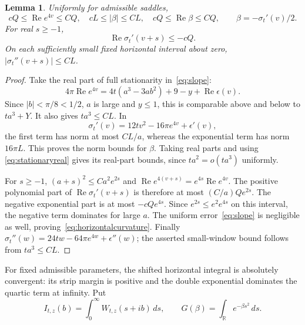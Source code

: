 \documentclass[11pt]{article}
\newtheorem{lemma}[theorem]{Lemma}
\theoremstyle{remark}\newtheorem{remark}[theorem]{Remark}
\newcommand{\R}{\mathbb R}\newcommand{\C}{\mathbb C}
\DeclareMathOperator{\Rea}{Re}\DeclareMathOperator{\Ima}{Im}
\begin{document}
\begin{lemma}\label{lem:geometry}
Uniformly for admissible saddles,
\begin{equation}\label{eq:curvature}
 cQ\leq\Rea e^{4v}\leq CQ,\quad
 cL\leq|\beta|\leq CL,\quad
 cQ\leq\Rea\beta\leq CQ,\qquad
 \beta=-\sigma_t'(v)/2.
\end{equation}
For real $s\geq-1$,
\begin{equation}\label{eq:horizontalcurvature}
 \Rea\sigma_t'(v+s)\leq-cQ.
\end{equation}
On each sufficiently small fixed horizontal interval about
zero, $|\sigma_t''(v+s)|\leq CL$.
\end{lemma}
\begin{proof}
Take the real part of full stationarity in~\eqref{eq:slope}:
\begin{equation}\label{eq:stationaryreal}
 4\pi\Rea e^{4v}
       =4t(a^3-3ab^2)+9-y+\Rea\epsilon(v).
\end{equation}
Since $|b|<\pi/8<1/2$, $a$ is large and $y\leq1$, this is
comparable above and below to $ta^3+Y$. It also gives
$ta^3\leq CL$. In
\[
 \sigma_t'(v)=12tv^2-16\pi e^{4v}+\epsilon'(v),
\]
the first term has norm at most $CL/a$, whereas the
exponential term has norm $16\pi L$. This proves the norm
bounds for $\beta$. Taking real parts and using
\eqref{eq:stationaryreal} gives its real-part bounds, since
$ta^2=o(ta^3)$ uniformly.

For $s\geq-1$, $(a+s)^2\leq Ca^2e^{2s}$ and
$\Rea e^{4(v+s)}=e^{4s}\Rea e^{4v}$.
The positive polynomial part of
$\Rea\sigma_t'(v+s)$ is therefore at most
$(C/a)Qe^{2s}$. The negative exponential part is at most
$-cQe^{4s}$. Since $e^{2s}\leq e^2e^{4s}$ on this interval,
the negative term dominates for large $a$.
The uniform error~\eqref{eq:slope} is negligible as well,
proving~\eqref{eq:horizontalcurvature}.
Finally $\sigma_t''(w)=24tw-64\pi e^{4w}+\epsilon''(w)$;
the asserted small-window bound follows from $ta^3\leq CL$.
\end{proof}

For fixed admissible parameters, the shifted horizontal
integral is absolutely convergent: its strip margin is positive
and the double exponential dominates the quartic term at
infinity. Put
\[
 I_{t,z}(b)=\int_0^\infty W_{t,z}(s+ib)\,ds,\qquad
 G(\beta)=\int_\R e^{-\beta s^2}\,ds.
\]
\end{document}
